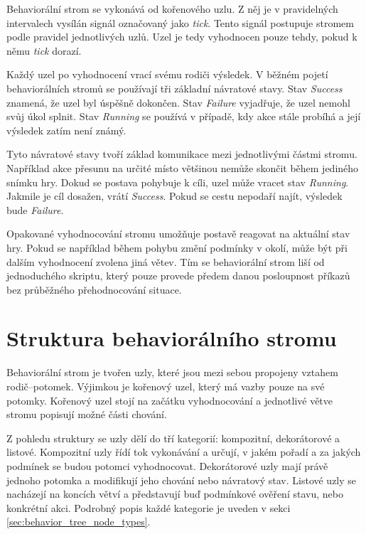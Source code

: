 Behaviorální strom se vykonává od kořenového uzlu. 
Z něj je v pravidelných intervalech vysílán signál označovaný jako \textit{tick}. 
Tento signál postupuje stromem podle pravidel jednotlivých uzlů. 
Uzel je tedy vyhodnocen pouze tehdy, pokud k němu \textit{tick} dorazí.\cite[s.~6]{colledanchise2018}

Každý uzel po vyhodnocení vrací svému rodiči výsledek. 
V běžném pojetí behaviorálních stromů se používají tři základní návratové stavy. 
Stav \textit{Success} znamená, že uzel byl úspěšně dokončen. Stav \textit{Failure} vyjadřuje, že uzel nemohl svůj úkol splnit. 
Stav \textit{Running} se používá v případě, kdy akce stále probíhá a její výsledek zatím není známý.\cite[s.~9, tab.~1.1]{colledanchise2018}

Tyto návratové stavy tvoří základ komunikace mezi jednotlivými částmi stromu. 
Například akce přesunu na určité místo většinou nemůže skončit během jediného snímku hry. 
Dokud se postava pohybuje k cíli, uzel může vracet stav \textit{Running}. 
Jakmile je cíl dosažen, vrátí \textit{Success}. 
Pokud se cestu nepodaří najít, výsledek bude \textit{Failure}.

Opakované vyhodnocování stromu umožňuje postavě reagovat na aktuální stav hry. 
Pokud se například během pohybu změní podmínky v okolí, může být při dalším vyhodnocení zvolena jiná větev. 
Tím se behaviorální strom liší od jednoduchého skriptu, který pouze provede předem danou posloupnost příkazů bez průběžného přehodnocování situace.\cite[s.~9]{colledanchise2018}

\section{Struktura behaviorálního stromu}
Behaviorální strom je tvořen uzly, které jsou mezi sebou propojeny vztahem rodič--potomek. 
Výjimkou je kořenový uzel, který má vazby pouze na své potomky. 
Kořenový uzel stojí na začátku vyhodnocování a jednotlivé větve stromu popisují možné části chování.\cite[s.~6, kap.~1.3]{colledanchise2018}

Z pohledu struktury se uzly dělí do tří kategorií: kompozitní, dekorátorové a listové. 
Kompozitní uzly řídí tok vykonávání a určují, v jakém pořadí a za jakých podmínek se budou potomci vyhodnocovat. 
Dekorátorové uzly mají právě jednoho potomka a modifikují jeho chování nebo návratový stav. 
Listové uzly se nacházejí na koncích větví a představují buď podmínkové ověření stavu, nebo konkrétní akci. 
Podrobný popis každé kategorie je uveden v sekci \ref{sec:behavior_tree_node_types}.

